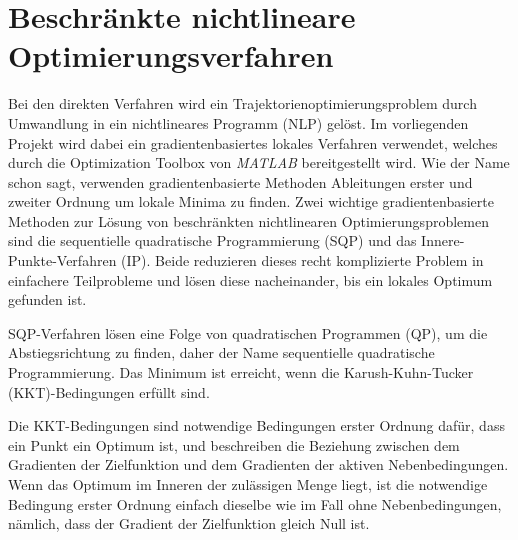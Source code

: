 



\section{Beschränkte nichtlineare Optimierungsverfahren}
Bei den direkten Verfahren wird ein Trajektorienoptimierungsproblem durch Umwandlung in ein nichtlineares Programm (NLP) gelöst. Im vorliegenden Projekt wird dabei ein gradientenbasiertes lokales Verfahren verwendet, welches durch die Optimization Toolbox von \textit{MATLAB} bereitgestellt wird. Wie der Name schon sagt, verwenden gradientenbasierte Methoden Ableitungen erster und zweiter Ordnung um lokale Minima zu finden. Zwei wichtige gradientenbasierte Methoden zur Lösung von beschränkten nichtlinearen Optimierungsproblemen sind die sequentielle quadratische Programmierung (SQP) und das Innere-Punkte-Verfahren (IP). Beide reduzieren dieses recht komplizierte Problem in einfachere Teilprobleme und lösen diese nacheinander, bis ein lokales Optimum gefunden ist.

SQP-Verfahren lösen eine Folge von quadratischen Programmen (QP), um die Abstiegsrichtung zu finden, daher der Name sequentielle quadratische Programmierung. Das Minimum ist erreicht, wenn die Karush-Kuhn-Tucker (KKT)-Bedingungen erfüllt sind.

Die KKT-Bedingungen sind notwendige Bedingungen erster Ordnung dafür, dass ein Punkt ein Optimum ist, und beschreiben die Beziehung zwischen dem Gradienten der Zielfunktion und dem Gradienten der aktiven Nebenbedingungen. Wenn das Optimum im Inneren der zulässigen Menge liegt, ist die notwendige Bedingung erster Ordnung einfach dieselbe wie im Fall ohne Nebenbedingungen, nämlich, dass der Gradient der Zielfunktion gleich Null ist.

